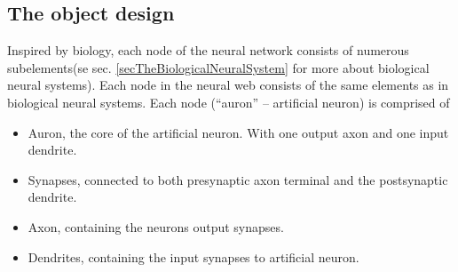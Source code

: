 

	








	\subsection{The object design}
	\label{ssecTheObjectDesign}
		Inspired by biology, each node of the neural network consists of numerous subelements(se sec. \ref{secTheBiologicalNeuralSystem} for more about biological neural systems). 
		Each node in the neural web consists of the same elements as in biological neural systems. 
		Each node (``auron'' -- artificial neuron) is comprised of 
		\begin{itemize}
			\item Auron, the core of the artificial neuron. With one output axon and one input dendrite.
			\item Synapses, connected to both presynaptic axon terminal and the postsynaptic dendrite.
			\item Axon, containing the neurons output synapses. %
			\item Dendrites, containing the input synapses to artificial neuron.
		\end{itemize}
		
